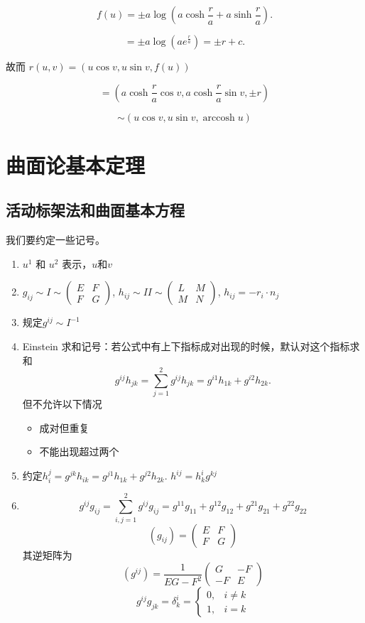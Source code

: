 \documentclass[lang=cn,10pt,thmcnt=section]{elegantbook}
\begin{document}
\[
f(u) = \pm a \log \left( a \cosh \frac{r}{a} + a \sinh \frac{r}{a} \right).
\]

\[
= \pm a \log \left( a e^{\frac{r}{a}} \right) = \pm r + c.
\]

故而 $r(u, v) = (u \cos v, u \sin v, f(u))$

\[
= \left( a \cosh \frac{r}{a} \cos v, a \cosh \frac{r}{a} \sin v, \pm r \right)
\]

\[
\sim (u \cos v, u \sin v, \operatorname{arccosh} u)
\]
\chapter{曲面论基本定理}
\section{活动标架法和曲面基本方程}
我们要约定一些记号。
\begin{enumerate}
    \item $u^1$ 和 $u^2$ 表示，$u \text{和}v$
    \item $g_{ij} \sim I \sim \begin{pmatrix} E & F \\ F & G \end{pmatrix}$, \quad $h_{ij} \sim II \sim \begin{pmatrix} L & M \\ M & N \end{pmatrix}$, \quad $h_{ij} = -r_i \cdot n_j$
    \item 规定$g^{ij}\sim I^{-1}$
    \item Einstein 求和记号：若公式中有上下指标成对出现的时候，默认对这个指标求和
    \[
    g^{ij}h_{jk}=\sum_{j=1}^{2} g^{ij} h_{jk} = g^{i1} h_{1k} + g^{i2} h_{2k}.
    \]但不允许以下情况
    \begin{itemize}
        \item 成对但重复
        \item 不能出现超过两个
    \end{itemize}
    \item  约定$h_i^j=  g^{jk} h_{ik} = g^{j1} h_{1k} + g^{j2} h_{2k}$. \quad $h^{ij} = h_k^i g^{kj}$
    \item
    \[
    g^{ij} g_{ij} = \sum_{i,j=1}^{2} g^{ij} g_{ij} = g^{11} g_{11} + g^{12} g_{12} + g^{21} g_{21} + g^{22} g_{22}
    \]
    \[
	(g_{ij}) = \begin{pmatrix}
	E & F \\
	F & G
	\end{pmatrix}
	\]
	其逆矩阵为
	\[
	(g^{ij}) = \frac{1}{EG - F^2}
	\begin{pmatrix}
	G & -F \\
	-F & E
	\end{pmatrix}
	\]
    \[
    g^{ij} g_{jk} = \delta_k^i = \begin{cases} 0, & i \neq k \\ 1, & i = k \end{cases}
    \]
\end{enumerate}
\end{document}
